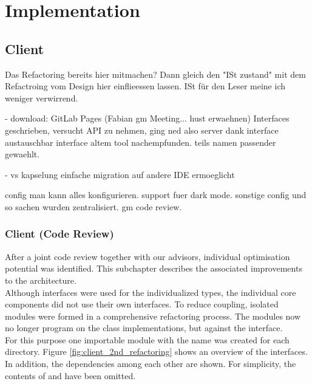 \section{Implementation}

\subsection{Client}
Das Refactoring bereits hier mitmachen?
Dann gleich den "ISt zustand" mit dem Refactroing vom Design hier einflieessen lassen.
ISt für den Leser meine ich weniger verwirrend.


- download:
GitLab Pages (Fabian gm Meeting... hust erwaehnen)
Interfaces geschrieben, versucht API zu nehmen, ging ned also server
dank interface austauschbar
interface altem tool nachempfunden. teils namen passender gewaehlt.

- vs kapselung
einfache migration auf andere IDE ermoeglicht

config
man kann alles konfigurieren. support fuer dark mode.
sonstige config und so sachen wurden zentralisiert. gm code review.


\subsubsection{Client (Code Review)}
After a joint code review together with our advisors, individual optimisation potential was identified.
This subchapter describes the associated improvements to the architecture. \\

Although interfaces were used for the individualized types,
the individual core components did not use their own interfaces.
To reduce coupling, isolated modules were formed in a comprehensive refactoring process.
The modules now no longer program on the class implementations, but against the interface. \\

For this purpose one importable module with the name  was created for each directory.
Figure \ref{fig:client_2nd_refactoring} shows an overview of the interfaces.
In addition, the dependencies among each other are shown.
For simplicity, the contents of  and  have been omitted. \\

